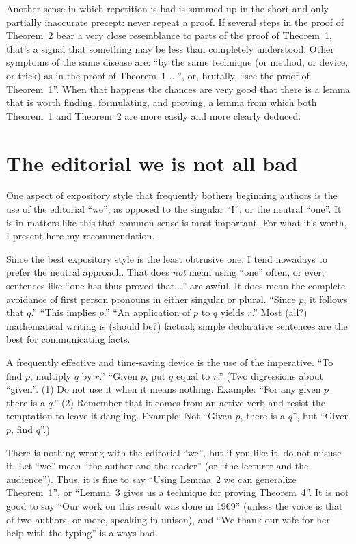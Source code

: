 \documentclass[12pt]{article}
\begin{document}
Another sense in which repetition is bad is summed up in the short and only partially inaccurate precept: never repeat a proof. If several steps in the proof of Theorem~2 bear a very close resemblance to parts of the proof of Theorem~1, that's a signal that something may be less than completely understood. Other symptoms of the same disease are: ``by the same technique (or method, or device, or trick) as in the proof of Theorem~1 $\dots$'', or, brutally, ``see the proof of Theorem~1''. When that happens the chances are very good that there is a lemma that is worth finding, formulating, and proving, a lemma from which both Theorem~1 and Theorem~2 are more easily and more clearly deduced. 

\section{The editorial we is not all bad}

One aspect of expository style that frequently bothers beginning authors is the use of the editorial ``we'', as opposed to the singular ``I'', or the neutral ``one''. It is in matters like this that common sense is most important. For what it's worth, I present here my recommendation.

Since the best expository style is the least obtrusive one, I tend nowadays to prefer the neutral approach. That does \emph{not} mean using ``one'' often, or ever; sentences like ``one has thus proved that$\dots$'' are awful. It does mean the complete avoidance of first person pronouns in either singular or plural. ``Since $p$, it follows that $q$.'' ``This implies $p$.'' ``An application of $p$ to $q$ yields $r$.'' Most (all?) mathematical writing is (should be?) factual; simple declarative sentences are the best for communicating facts. 

A frequently effective and time-saving device is the use of the imperative. ``To find $p$, multiply $q$ by $r$.'' ``Given $p$, put $q$ equal to $r$.'' (Two digressions about ``given''. (1) Do not use it when it means nothing. Example: ``For any given $p$ there is a $q$.'' (2) Remember that it comes from an active verb and resist the temptation to leave it dangling. Example: Not ``Given $p$, there is a $q$'', but ``Given $p$, find $q$''.)

There is nothing wrong with the editorial ``we'', but if you like it, do not misuse it. Let ``we'' mean ``the author and the reader'' (or ``the lecturer and the audience''). Thus, it is fine to say ``Using Lemma~2 we can generalize Theorem~1'', or ``Lemma~3 gives us a technique for proving Theorem~4''. It is not good to say ``Our work on this result was done in 1969'' (unless the voice is that of two authors, or more, speaking in unison), and ``We thank our wife for her help with the typing'' is always bad. 
\end{document}
